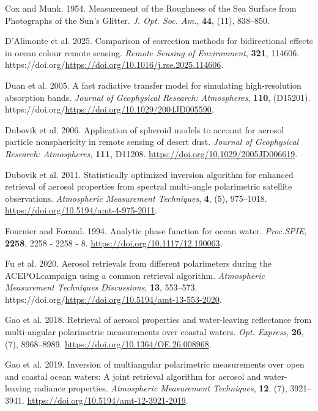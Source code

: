\documentclass[
  11pt,
  letterpaper,
]{scrreprt}
\newlength{\cslhangindent}
\newenvironment{CSLReferences}[2] %
 {\begin{list}{}{%
  \setlength{\itemindent}{0pt}
  \setlength{\leftmargin}{0pt}
  \setlength{\parsep}{0pt}
  \ifodd #1
   \setlength{\leftmargin}{\cslhangindent}
   \setlength{\itemindent}{-1\cslhangindent}
  \fi
  \setlength{\itemsep}{#2\baselineskip}}}
 {\end{list}}
\begin{document}
\begin{CSLReferences}{1}{1}
Cox and Munk. 1954. {Measurement of the Roughness of the Sea Surface
from Photographs of the Sun's Glitter}. \emph{J. Opt. Soc. Am.},
\textbf{44}, (11), 838--850.

D'Alimonte et al. 2025. Comparison of correction methods for
bidirectional effects in ocean colour remote sensing. \emph{Remote
Sensing of Environment}, \textbf{321}, 114606.
https://doi.org/\url{https://doi.org/10.1016/j.rse.2025.114606}.

Duan et al. 2005. A fast radiative transfer model for simulating
high-resolution absorption bands. \emph{Journal of Geophysical Research:
Atmospheres}, \textbf{110}, (D15201).
https://doi.org/\url{https://doi.org/10.1029/2004JD005590}.

Dubovik et al. 2006. Application of spheroid models to account for
aerosol particle nonsphericity in remote sensing of desert dust.
\emph{Journal of Geophysical Research: Atmospheres}, \textbf{111},
D11208. \url{https://doi.org/10.1029/2005JD006619}.

Dubovik et al. 2011. Statistically optimized inversion algorithm for
enhanced retrieval of aerosol properties from spectral multi-angle
polarimetric satellite observations. \emph{Atmospheric Measurement
Techniques}, \textbf{4}, (5), 975--1018.
\url{https://doi.org/10.5194/amt-4-975-2011}.

Fournier and Forand. 1994. Analytic phase function for ocean water.
\emph{Proc.SPIE}, \textbf{2258}, 2258 - 2258 - 8.
\url{https://doi.org/10.1117/12.190063}.

Fu et al. 2020. Aerosol retrievals from different polarimeters during
the ACEPOLcampaign using a common retrieval algorithm. \emph{Atmospheric
Measurement Techniques Discussions}, \textbf{13}, 553--573.
https://doi.org/\url{https://doi.org/10.5194/amt-13-553-2020}.

Gao et al. 2018. Retrieval of aerosol properties and water-leaving
reflectance from multi-angular polarimetric measurements over coastal
waters. \emph{Opt. Express}, \textbf{26}, (7), 8968--8989.
\url{https://doi.org/10.1364/OE.26.008968}.

Gao et al. 2019. Inversion of multiangular polarimetric measurements
over open and coastal ocean waters: A joint retrieval algorithm for
aerosol and water-leaving radiance properties. \emph{Atmospheric
Measurement Techniques}, \textbf{12}, (7), 3921--3941.
\url{https://doi.org/10.5194/amt-12-3921-2019}.


\end{CSLReferences}
\end{document}
